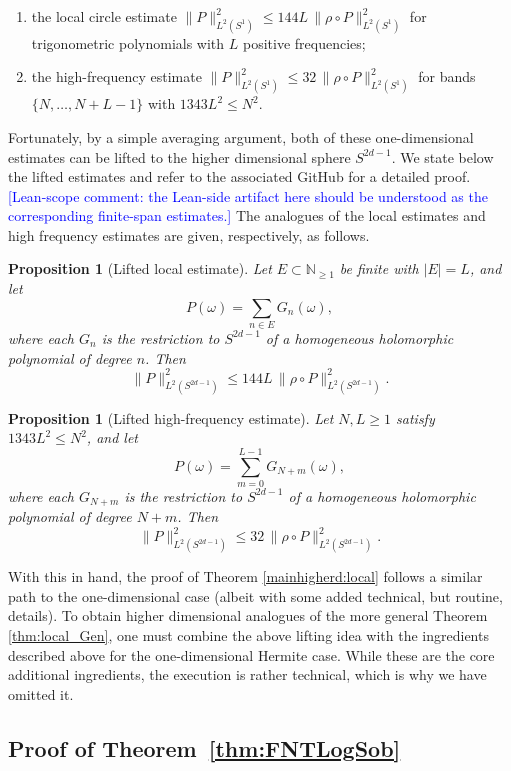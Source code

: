 \documentclass[11pt]{amsart}
\newtheorem{proposition}[theorem]{Proposition}
\theoremstyle{remark}
\newcommand{\N}{\mathbb{N}}
\newcommand{\abs}[1]{\lvert #1 \rvert}
\newcommand{\norm}[1]{\lVert #1 \rVert}
\newcommand{\rhoFn}{\rho}
\newcommand{\Sphere}{S^{2d-1}}
\begin{document}
\begin{enumerate}
\item the local circle estimate
$\norm{P}_{L^2(S^1)}^2 \le 144 L\, \norm{\rhoFn \circ P}_{L^2(S^1)}^2$
for trigonometric polynomials with $L$ positive frequencies;
\item the high-frequency estimate
$\norm{P}_{L^2(S^1)}^2 \le 32\, \norm{\rhoFn \circ P}_{L^2(S^1)}^2$
for bands $\{N,\dots,N+L-1\}$ with $1343L^2 \le N^2$.
\end{enumerate}
Fortunately, by a simple averaging argument, both of these one-dimensional estimates can be lifted to the higher dimensional sphere $S^{2d-1}$. We state below the lifted estimates and refer to the associated GitHub for a detailed proof. \textcolor{blue}{[Lean-scope comment: the Lean-side artifact here should be understood as the corresponding finite-span estimates.] } The analogues of the local estimates and high frequency estimates are given, respectively, as follows.
\begin{proposition}[Lifted local estimate]\label{prop:lifted-local}
Let $E \subset \N_{\ge 1}$ be finite with $\abs{E} = L$, and let
\[
P(\omega) = \sum_{n \in E} G_n(\omega),
\]
where each $G_n$ is the restriction to $\Sphere$ of a homogeneous
holomorphic polynomial of degree $n$.  Then
\[
\norm{P}_{L^2(\Sphere)}^2
\le
144 L\, \norm{\rhoFn \circ P}_{L^2(\Sphere)}^2.
\]
\end{proposition}
\begin{proposition}[Lifted high-frequency estimate]\label{prop:lifted-high}
Let $N,L \ge 1$ satisfy $1343L^2 \le N^2$, and let
\[
P(\omega) = \sum_{m=0}^{L-1} G_{N+m}(\omega),
\]
where each $G_{N+m}$ is the restriction to $\Sphere$ of a homogeneous
holomorphic polynomial of degree $N+m$.  Then
\[
\norm{P}_{L^2(\Sphere)}^2
\le
32\, \norm{\rhoFn \circ P}_{L^2(\Sphere)}^2.
\]
\end{proposition}
With this in hand, the proof of Theorem \ref{mainhigherd:local} follows a similar path to the one-dimensional case (albeit with some added technical, but routine, details). To obtain higher dimensional analogues of the more general Theorem \ref{thm:local_Gen}, one must combine the above lifting idea with the ingredients described above for the one-dimensional Hermite case. While these are the core additional ingredients, the execution is rather technical, which is why we have omitted it.

\subsection{Proof of Theorem~\ref{thm:FNTLogSob}}\label{subsec:FNTproof}
\end{document}
